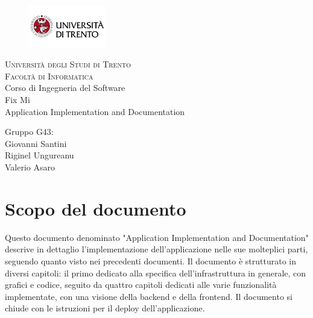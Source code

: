 \documentclass{report}
\begin{document}
\begin{titlepage}
	\begin{figure}[t]
		\centering\includegraphics[width=0.3\textwidth]{images/unitn-logo}
	\end{figure}
	\begin{center}
		\textsc{ \LARGE{Università degli Studi di Trento \\}}
		\textsc{ \LARGE{Facoltà di Informatica\\ }}
		\textnormal{ \LARGE{Corso di Ingegneria del Software\\}}
		\vspace{30mm}
		\fontsize{10mm}{7mm}\selectfont
		\textup{Fix Mi \\ Application Implementation and Documentation}\\
	\end{center}

	\vspace{25mm}

	\centering
	\large Gruppo G43: \\ Giovanni Santini\\ Riginel Ungureanu \\ Valerio Asaro

	\vspace{20mm}


\end{titlepage}




\pagestyle{fancy}
\fancyhead[R]{\chaptername\ \thechapter}  %

\tableofcontents
\newpage



\section{Scopo del documento}
Questo documento denominato "Application Implementation and Documentation" descrive in dettaglio l'implementazione dell'applicazione nelle sue molteplici parti, seguendo quanto visto nei precedenti documenti. Il documento è strutturato in diversi capitoli: il primo dedicato alla specifica dell'infrastruttura in generale, con grafici e codice, seguito da quattro capitoli dedicati alle varie funzionalità implementate, con una visione della backend e della frontend. Il documento si chiude con le istruzioni per il deploy dell'applicazione.
\end{document}

